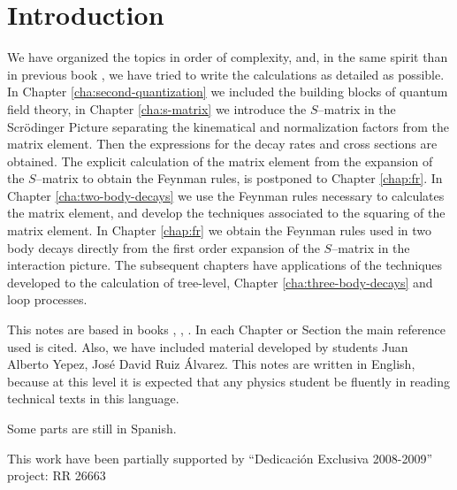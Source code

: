 
\chapter*{Introduction}
\label{cha:introduction} %


We have organized the topics in order of complexity, and, in the same
spirit than in  previous book \cite{lsm}, we have tried to write the
calculations as detailed as possible. In
Chapter 
\ref{cha:second-quantization} %
we included the building blocks
of quantum field theory, in Chapter 
\ref{cha:s-matrix} %
we introduce
the $S$--matrix in the Scr\"odinger Picture separating the kinematical
and normalization factors from the matrix element. Then the expressions
for the decay rates and cross sections are obtained. The explicit
calculation of the matrix element from the expansion of the
$S$--matrix to obtain the Feynman rules, is postponed to Chapter
\ref{chap:fr}. %
In Chapter 
\ref{cha:two-body-decays} %
we use the Feynman
rules necessary to calculates the matrix element, and develop the
techniques associated to the squaring of the matrix element. In
Chapter 
\ref{chap:fr} %
we obtain the Feynman rules used in two body
decays directly from the first order expansion of the $S$--matrix in
the interaction picture. The subsequent chapters have applications of
the techniques developed to the calculation of tree-level, 
Chapter 
\ref{cha:three-body-decays} %
and loop processes.


This notes are based in books \cite{Maggiore:2005qv}, \cite{Mandl:1985bg}, \cite{Lahiri:2005sm}.  In each Chapter or Section the main reference used is cited. Also, we have included material developed by students Juan Alberto Yepez, Jos\'e David Ruiz \'Alvarez. This notes are written in English, because at this level it is expected that any physics student be fluently in reading technical texts in this language.

Some parts are still in Spanish. 

This work have been partially supported by ``Dedicaci\'on Exclusiva 2008-2009''  project: RR 26663

